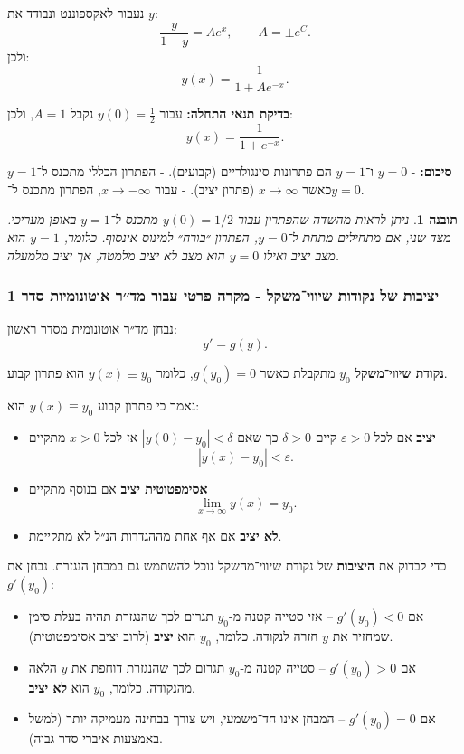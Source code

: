 \documentclass{article}
\numberwithin{equation}{section}
\newtheorem{insight}{תובנה}[section]
\begin{document}
נעבור לאקספוננט ונבודד את $y$:  
\[
\frac{y}{1-y} = Ae^x, \qquad A=\pm e^C.
\]  
ולכן:
\[
\boxed{y(x) = \frac{1}{1+Ae^{-x}}}.
\]

\textbf{בדיקת תנאי התחלה:}  
עבור $y(0)=\tfrac{1}{2}$ נקבל $A=1$, ולכן:
\[
\boxed{y(x)=\frac{1}{1+e^{-x}}}.
\]

\textbf{סיכום:}  
- $y=0$ ו־$y=1$ הם פתרונות סינגולריים (קבועים).  
- הפתרון הכללי מתכנס ל־$y=1$ כאשר $x\to\infty$ (פתרון יציב).  
- עבור $x\to -\infty$, הפתרון מתכנס ל־$y=0$.  


\begin{insight}
ניתן לראות מהשדה שהפתרון עבור $y(0)=1/2$ מתכנס ל־$y=1$ באופן מעריכי.  
מצד שני, אם מתחילים מתחת ל־$y=0$, הפתרון ״בורח״ למינוס אינסוף.  
כלומר, $y=1$ הוא מצב יציב ואילו $y=0$ הוא מצב לא יציב מלמטה, אך יציב מלמעלה.
\end{insight}

\subsubsection{יציבות של נקודות שיווי־משקל - מקרה פרטי עבור מד׳׳ר אוטונומיות סדר 1}

נבחן מד״ר אוטונומית מסדר ראשון:
\[
y' = g(y).
\]

\textbf{נקודת שיווי־משקל} $y_0$ מתקבלת כאשר $g(y_0)=0$, כלומר $y(x)\equiv y_0$ הוא פתרון קבוע.

נאמר כי פתרון קבוע $y(x)\equiv y_0$ הוא:
\begin{itemize}
  \item \textbf {יציב} אם לכל $\varepsilon>0$ קיים $\delta>0$ כך שאם $|y(0)-y_0|<\delta$ אז לכל $x>0$ מתקיים 
  \[
  |y(x)-y_0|<\varepsilon.
  \]

  \item \textbf{אסימפטוטית יציב} אם בנוסף מתקיים
  \[
  \lim_{x\to\infty} y(x) = y_0.
  \]

  \item \textbf{לא יציב} אם אף אחת מההגדרות הנ״ל לא מתקיימת.
\end{itemize}

כדי לבדוק את \textbf{היציבות} של נקודת שיווי־מהשקל נוכל להשתמש גם במבחן הנגזרת. נבחן את $g'(y_0)$:

\begin{itemize}
  \item אם $g'(y_0) < 0$ – אזי סטייה קטנה מ-$y_0$ תגרום לכך שהנגזרת תהיה בעלת סימן שמחזיר את $y$ חזרה לנקודה.  
  כלומר, $y_0$ הוא \textbf{יציב} (לרוב יציב אסימפטוטית).
  
  \item אם $g'(y_0) > 0$ – סטייה קטנה מ-$y_0$ תגרום לכך שהנגזרת דוחפת את $y$ הלאה מהנקודה.  
  כלומר, $y_0$ הוא \textbf{לא יציב}.
  
  \item אם $g'(y_0)=0$ – המבחן אינו חד־משמעי, ויש צורך בבחינה מעמיקה יותר (למשל באמצעות איברי סדר גבוה).
\end{itemize}
\end{document}

